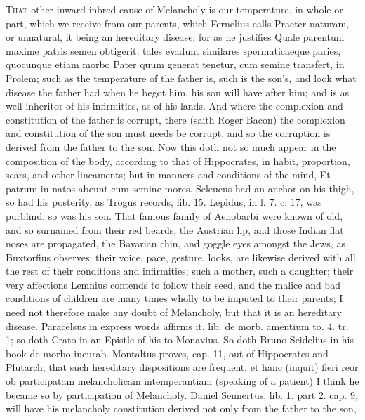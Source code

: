 {{\lettrine{T}{hat} other inward inbred cause of Melancholy is our temperature, in
whole or part, which we receive from our parents, which Fernelius
calls Praeter naturam, or unnatural, it being an hereditary disease;
for as he justifies Quale parentum maxime patris semen obtigerit,
tales evadunt similares spermaticaeque paries, quocunque etiam morbo
Pater quum generat tenetur, cum semine transfert, in Prolem; such as
the temperature of the father is, such is the son's, and look what
disease the father had when he begot him, his son will have after him;
and is as well inheritor of his infirmities, as of his lands. And
where the complexion and constitution of the father is corrupt, there
(saith Roger Bacon) the complexion and constitution of the son
must needs be corrupt, and so the corruption is derived from the father
to the son. Now this doth not so much appear in the composition of the
body, according to that of Hippocrates, in habit, proportion,
scars, and other lineaments; but in manners and conditions of the mind,
Et patrum in natos abeunt cum semine mores.
Seleucus had an anchor on his thigh, so had his posterity, as Trogus
records, lib. 15. Lepidus, in \Pliny{} l. 7. c. 17, was purblind, so was
his son. That famous family of Aenobarbi were known of old, and so
surnamed from their red beards; the Austrian lip, and those Indian flat
noses are propagated, the Bavarian chin, and goggle eyes amongst the
Jews, as Buxtorfius observes; their voice, pace, gesture, looks,
are likewise derived with all the rest of their conditions and
infirmities; such a mother, such a daughter; their very
affections Lemnius contends to follow their seed, and the malice
and bad conditions of children are many times wholly to be imputed to
their parents; I need not therefore make any doubt of Melancholy, but
that it is an hereditary disease.  Paracelsus in express words
affirms it, lib. de morb. amentium to. 4. tr. 1; so doth Crato in
an Epistle of his to Monavius. So doth Bruno Seidelius in his book de
morbo incurab. Montaltus proves, cap. 11, out of Hippocrates and
Plutarch, that such hereditary dispositions are frequent, et hanc
(inquit) fieri reor ob participatam melancholicam intemperantiam
(speaking of a patient) I think he became so by participation of
Melancholy. Daniel Sennertus, lib. 1. part 2. cap. 9, will have his
melancholy constitution derived not only from the father to the son,
}}
